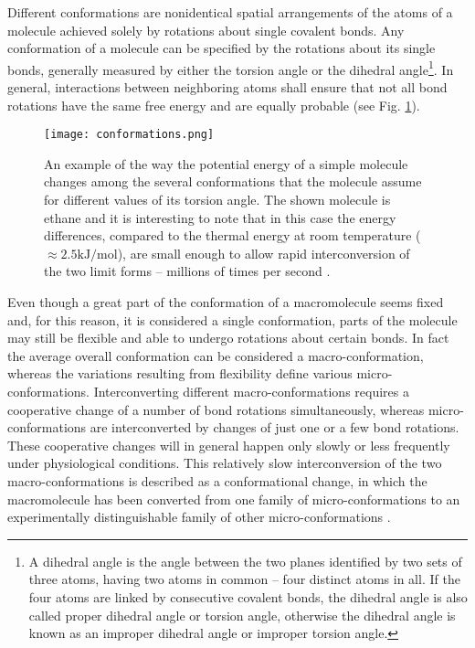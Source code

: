 Different conformations are nonidentical spatial arrangements of the atoms of a molecule achieved solely by rotations about single covalent bonds. %
Any conformation of a molecule %
can be specified by the rotations about its single bonds, generally measured by either the torsion angle or the dihedral angle\footnote{A dihedral angle is the angle between the two planes identified by two sets of three atoms, having two atoms in common -- four distinct atoms in all. If the four atoms are linked by consecutive covalent bonds, the dihedral angle is also called proper dihedral angle or torsion angle, otherwise the dihedral angle is known as an improper dihedral angle or improper torsion angle.}. In general, interactions between neighboring atoms shall ensure that not all bond rotations have the same free energy and are equally probable (see Fig. \ref{fig:EthaneConf}).


\begin{figure}[h]
\centering
\begin{minipage}[t]{0.88\textwidth}
\centering
\texttt{[image: conformations.png]}

\caption{\small{An example of the way the potential energy of a simple molecule changes among the several conformations that the molecule assume for different values of its torsion angle. The shown molecule is ethane and it is interesting to note that in this case the energy differences, compared to the thermal energy at room temperature ($\approx 2.5 \text{kJ}/\text{mol}$), are small enough to allow rapid interconversion of the two limit forms -- millions of times per second
\cite{nelson2008lehninger}.}}

\label{fig:EthaneConf}
\end{minipage} 
\end{figure}



Even though a great part of the conformation of a macromolecule seems fixed and, for this reason, it is considered a single conformation, parts of the molecule may still be flexible and able to undergo rotations about certain bonds. In fact the average overall conformation can be considered a macro-conformation, whereas the variations resulting from flexibility define various micro-conformations. Interconverting different macro-conformations requires a cooperative change of a number of bond rotations simultaneously, whereas micro-conformations are interconverted by changes of just one or a few bond rotations. These cooperative changes will in general happen only slowly or less frequently under physiological conditions. This relatively slow interconversion of the two macro-conformations is described as a conformational change, in which the macromolecule has been converted from one family of micro-conformations to an experimentally distinguishable family of other micro-conformations
\cite{creighton2010biophysical}.

